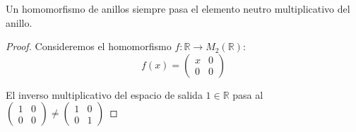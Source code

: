 \begin{ce}
    Un homomorfismo de anillos siempre pasa el elemento neutro multiplicativo del anillo.
\end{ce}

\begin{proof}
    Consideremos el homomorfismo $f:\mathbb{R} \to M_{2}(\mathbb{R})$:
    \begin{equation}
        f(x) = \begin{pmatrix} x & 0\\ 0 & 0 \end{pmatrix} 
    \end{equation}

    El inverso multiplicativo del espacio de salida $1 \in \mathbb{R}$ pasa al $\begin{pmatrix} 1 & 0\\ 0 & 0 \end{pmatrix} \neq \begin{pmatrix} 1 & 0\\ 0 & 1 \end{pmatrix}$
\end{proof}
